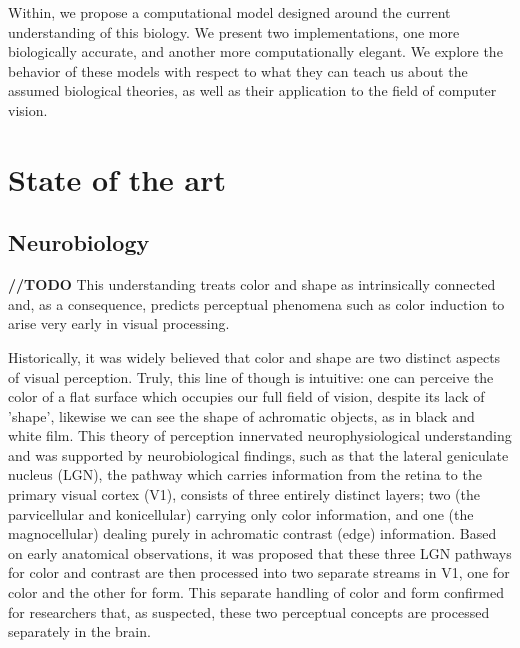 \documentclass[journal,onecolumn]{IEEEtran}
\begin{document}
Within, we propose a computational model designed around the current understanding of this biology. We present two implementations, one more biologically accurate, and another more computationally elegant. We explore the behavior of these models with respect to what they can teach us about the assumed biological theories, as well as their application to the field of computer vision.


%
%
%
\section{State of the art}


\subsection{Neurobiology}


\textbf{//TODO} This understanding treats color and shape as intrinsically connected and, as a consequence, predicts perceptual phenomena such as color induction to arise very early in visual processing.

Historically, it was widely believed that color and shape are two distinct aspects of visual perception. Truly, this line of though is intuitive: one can perceive the color of a flat surface which occupies our full field of vision, despite its lack of 'shape', likewise we can see the shape of achromatic objects, as in black and white film. This theory of perception innervated neurophysiological understanding and was supported by neurobiological findings, such as that the lateral geniculate nucleus (LGN), the pathway which carries information from the retina to the primary visual cortex (V1), consists of three entirely distinct layers; two (the parvicellular and konicellular) carrying only color information, and one (the magnocellular) dealing purely in achromatic contrast (edge) information. Based on early anatomical observations, it was proposed that these three LGN pathways for color and contrast are then processed into two separate streams in V1, one for color and the other for form. This separate handling of color and form confirmed for researchers that, as suspected, these two perceptual concepts are processed separately in the brain.
\end{document}
